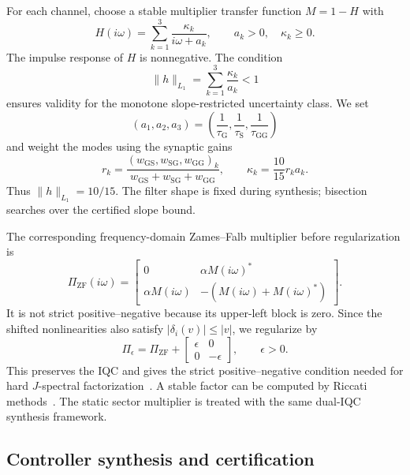 \documentclass[9pt,twocolumn,twoside]{pnas-new}
\newcommand{\bmat}[1]{\begin{bmatrix}#1\end{bmatrix}}
\newcommand{\mrm}[1]{\mathrm{#1}}
\newcommand{\Srate}{\mathrm{S}}
\newcommand{\Grate}{\mathrm{G}}
\begin{document}
For each channel, choose a stable multiplier transfer function $M=1-H$ with
\begin{equation}
H(i\omega)=\sum_{k=1}^3\frac{\kappa_k}{i\omega+a_k},\qquad
a_k>0,\quad \kappa_k\geq0.
\label{eq:zf-filter}
\end{equation}
The impulse response of $H$ is nonnegative. The condition
\begin{equation*}
\|h\|_{L_1}=\sum_{k=1}^3\frac{\kappa_k}{a_k}<1
\end{equation*}
ensures validity for the monotone slope-restricted uncertainty class. We set
\begin{equation*}
(a_1,a_2,a_3)=\left(\frac{1}{\tau_{\Grate}},\frac{1}{\tau_{\Srate}},
\frac{1}{\tau_{\mrm{GG}}}\right)
\end{equation*}
and weight the modes using the synaptic gains
\begin{equation*}
r_k=\frac{(w_{\mrm{GS}},w_{\mrm{SG}},w_{\mrm{GG}})_k}
{w_{\mrm{GS}}+w_{\mrm{SG}}+w_{\mrm{GG}}},\qquad
\kappa_k=\frac{10}{15}r_k a_k.
\end{equation*}
Thus $\|h\|_{L_1}=10/15$. The filter shape is fixed during synthesis; bisection searches over the certified slope bound.

The corresponding frequency-domain Zames--Falb multiplier before regularization is
\begin{equation}
\Pi_{\mathrm{ZF}}(i\omega)=
\bmat{0&\alpha M(i\omega)^*\\
\alpha M(i\omega)&-(M(i\omega)+M(i\omega)^*)}.
\label{eq:zf-multiplier}
\end{equation}
It is not strict positive--negative because its upper-left block is zero. Since the shifted nonlinearities also satisfy $|\delta_i(v)|\leq|v|$, we regularize by
\begin{equation}
\Pi_\epsilon=\Pi_{\mathrm{ZF}}+\bmat{\epsilon&0\\0&-\epsilon},\qquad \epsilon>0.
\label{eq:regularized}
\end{equation}
This preserves the IQC and gives the strict positive--negative condition needed for hard $J$-spectral factorization~\cite{Seiler2015,Meinsma1995}. A stable factor can be computed by Riccati methods~\cite{Pfifer2015}. The static sector multiplier is treated with the same dual-IQC synthesis framework.

\subsection{Controller synthesis and certification}
\end{document}
